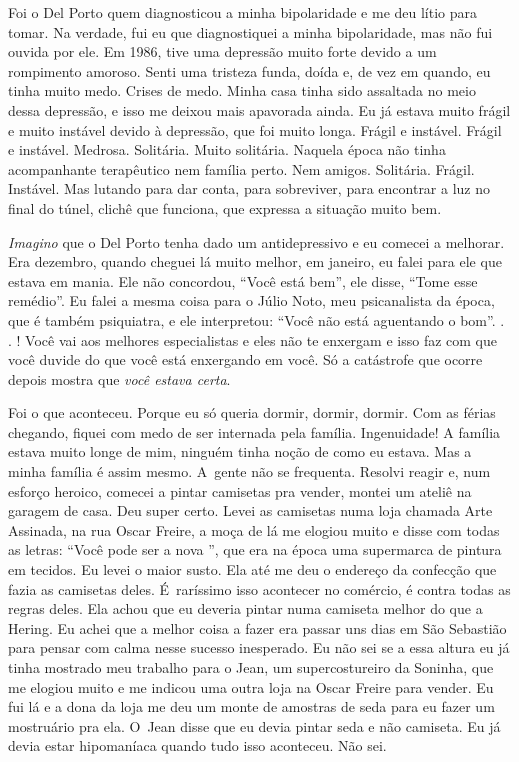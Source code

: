 Foi o Del Porto quem diagnosticou a minha bipolaridade e me deu lítio
para tomar. Na verdade, fui eu que diagnostiquei a minha bipolaridade,
mas não fui ouvida por ele. Em 1986, tive uma depressão muito forte
devido a um rompimento amoroso. Senti uma tristeza funda, doída e, de
vez em quando, eu tinha muito medo. Crises de medo. Minha casa tinha
sido assaltada no meio dessa depressão, e isso me deixou mais apavorada
ainda. Eu já estava muito frágil e muito instável devido à depressão,
que foi muito longa. Frágil e instável. Frágil e instável. Medrosa.
Solitária. Muito solitária. Naquela época não tinha acompanhante
terapêutico nem família perto. Nem amigos. Solitária. Frágil. Instável.
Mas lutando para dar conta, para sobreviver, para encontrar a luz no
final do túnel, clichê que funciona, que expressa a situação muito bem.

\emph{Imagino} que o Del Porto tenha dado um antidepressivo e eu comecei
a melhorar. Era dezembro, quando cheguei lá muito melhor, em janeiro, eu
falei para ele que estava em mania. Ele não concordou, ``Você está
bem'', ele disse, ``Tome esse remédio''. Eu falei a mesma coisa para o
Júlio Noto, meu psicanalista da época, que é também psiquiatra, e ele
interpretou: ``Você não está aguentando o bom''. . . ! Você
vai aos melhores especialistas e eles não te enxergam e isso faz com que
você duvide do que você está enxergando em você. Só a catástrofe que
ocorre depois mostra que \emph{você estava certa}.

Foi o que aconteceu. Porque eu só queria dormir, dormir, dormir. Com as
férias chegando, fiquei com medo de ser internada pela família.
Ingenuidade! A família estava muito longe de mim, ninguém tinha noção de
como eu estava. Mas a minha família é assim mesmo. A~gente não se
frequenta. Resolvi reagir e, num esforço heroico, comecei a pintar
camisetas pra vender, montei um ateliê na garagem de casa. Deu super
certo. Levei as camisetas numa loja chamada Arte Assinada, na rua Oscar
Freire, a moça de lá me elogiou muito e disse com todas as letras:
``Você pode ser a nova '', que era na época uma supermarca de
pintura em tecidos. Eu levei o maior susto. Ela até me deu o endereço da
confecção que fazia as camisetas deles. É~raríssimo isso acontecer no
comércio, é contra todas as regras deles. Ela achou que eu deveria
pintar numa camiseta melhor do que a Hering. Eu achei que a melhor coisa
a fazer era passar uns dias em São Sebastião para pensar com calma nesse
sucesso inesperado. Eu não sei se a essa altura eu já tinha mostrado meu
trabalho para o Jean, um supercostureiro da Soninha, que me elogiou
muito e me indicou uma outra loja na Oscar Freire para vender. Eu fui lá
e a dona da loja me deu um monte de amostras de seda para eu fazer um
mostruário pra ela. O~Jean disse que eu devia pintar seda e não
camiseta. Eu já devia estar hipomaníaca quando tudo isso aconteceu. Não
sei.


